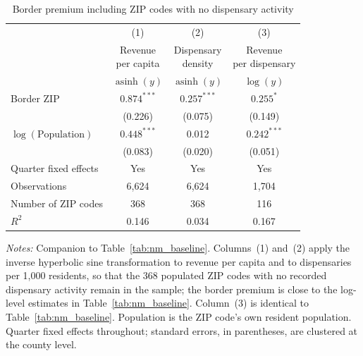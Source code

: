 \begin{table}[htbp]
\centering
\caption{Border premium including ZIP codes with no dispensary activity}
\label{tab:nm_baseline_zeroinclusive}

\begin{tabular*}{\textwidth}{@{\extracolsep{\fill}}lccc}
\toprule
& (1) & (2) & (3) \\
& \shortstack{Revenue\\per capita}
& \shortstack{Dispensary\\density}
& \shortstack{Revenue\\per dispensary} \\
& $\operatorname{asinh}(y)$
& $\operatorname{asinh}(y)$
& $\log(y)$ \\
\midrule

Border ZIP
    & $0.874^{***}$
    & $0.257^{***}$
    & $0.255^{*}$ \\
    & (0.226)
    & (0.075)
    & (0.149) \\

\addlinespace

$\log(\text{Population})$
    & $0.448^{***}$
    & 0.012
    & $0.242^{***}$ \\
    & (0.083)
    & (0.020)
    & (0.051) \\

\midrule

Quarter fixed effects
    & Yes & Yes & Yes \\

Observations
    & 6,624
    & 6,624
    & 1,704 \\

Number of ZIP codes
    & 368
    & 368
    & 116 \\

$R^{2}$
    & 0.146
    & 0.034
    & 0.167 \\

\bottomrule
\end{tabular*}

\begin{minipage}{\textwidth}
\vspace{0.4em}
\fontsize{9pt}{9pt}\selectfont

\textit{Notes:} Companion to Table~\ref{tab:nm_baseline}. Columns~(1) and~(2)
apply the inverse hyperbolic sine transformation to revenue per capita and to
dispensaries per 1{,}000 residents, so that the 368 populated ZIP codes with no
recorded dispensary activity remain in the sample; the border premium is close
to the log-level estimates in Table~\ref{tab:nm_baseline}. Column~(3) is
identical to Table~\ref{tab:nm_baseline}. $\text{Population}$ is the ZIP code's
own resident population. Quarter fixed effects throughout; standard errors,
in parentheses, are clustered at the county level.
\end{minipage}

\end{table}
